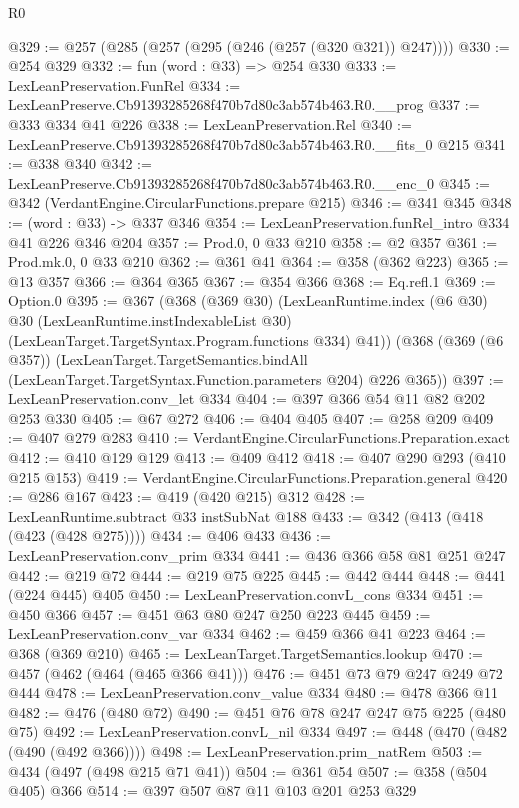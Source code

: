 \begin{lexlean}{R0}
\begin{coremodule}
@329 := @257 (@285 (@257 (@295 (@246 (@257 (@320 @321)) @247))))
@330 := @254 @329
@332 := fun (word : @33) => @254 @330
@333 := LexLeanPreservation.FunRel
@334 := LexLeanPreserve.Cb91393285268f470b7d80c3ab574b463.R0.__prog
@337 := @333 @334 @41 @226
@338 := LexLeanPreservation.Rel
@340 := LexLeanPreserve.Cb91393285268f470b7d80c3ab574b463.R0.__fits_0 @215
@341 := @338 @340
@342 := LexLeanPreserve.Cb91393285268f470b7d80c3ab574b463.R0.__enc_0
@345 := @342 (VerdantEngine.CircularFunctions.prepare @215)
@346 := @341 @345
@348 := (word : @33) -> @337 @346
@354 := LexLeanPreservation.funRel_intro @334 @41 @226 @346 @204
@357 := Prod.{0, 0} @33 @210
@358 := @2 @357
@361 := Prod.mk.{0, 0} @33 @210
@362 := @361 @41
@364 := @358 (@362 @223)
@365 := @13 @357
@366 := @364 @365
@367 := @354 @366
@368 := Eq.refl.{1}
@369 := Option.{0}
@395 := @367
    (@368
      (@369 @30)
      (LexLeanRuntime.index
        (@6 @30)
        @30
        (LexLeanRuntime.instIndexableList @30)
        (LexLeanTarget.TargetSyntax.Program.functions @334)
        @41))
    (@368
      (@369 (@6 @357))
      (LexLeanTarget.TargetSemantics.bindAll
        (LexLeanTarget.TargetSyntax.Function.parameters @204)
        @226
        @365))
@397 := LexLeanPreservation.conv_let @334
@404 := @397 @366 @54 @11 @82 @202 @253 @330
@405 := @67 @272
@406 := @404 @405
@407 := @258 @209
@409 := @407 @279 @283
@410 := VerdantEngine.CircularFunctions.Preparation.exact
@412 := @410 @129 @129
@413 := @409 @412
@418 := @407 @290 @293 (@410 @215 @153)
@419 := VerdantEngine.CircularFunctions.Preparation.general
@420 := @286 @167
@423 := @419 (@420 @215) @312
@428 := LexLeanRuntime.subtract @33 instSubNat @188
@433 := @342 (@413 (@418 (@423 (@428 @275))))
@434 := @406 @433
@436 := LexLeanPreservation.conv_prim @334
@441 := @436 @366 @58 @81 @251 @247
@442 := @219 @72
@444 := @219 @75 @225
@445 := @442 @444
@448 := @441 (@224 @445) @405
@450 := LexLeanPreservation.convL_cons @334
@451 := @450 @366
@457 := @451 @63 @80 @247 @250 @223 @445
@459 := LexLeanPreservation.conv_var @334
@462 := @459 @366 @41 @223
@464 := @368 (@369 @210)
@465 := LexLeanTarget.TargetSemantics.lookup
@470 := @457 (@462 (@464 (@465 @366 @41)))
@476 := @451 @73 @79 @247 @249 @72 @444
@478 := LexLeanPreservation.conv_value @334
@480 := @478 @366 @11
@482 := @476 (@480 @72)
@490 := @451 @76 @78 @247 @247 @75 @225 (@480 @75)
@492 := LexLeanPreservation.convL_nil @334
@497 := @448 (@470 (@482 (@490 (@492 @366))))
@498 := LexLeanPreservation.prim_natRem
@503 := @434 (@497 (@498 @215 @71 @41))
@504 := @361 @54
@507 := @358 (@504 @405) @366
@514 := @397 @507 @87 @11 @103 @201 @253 @329

\end{coremodule}
\end{lexlean}
